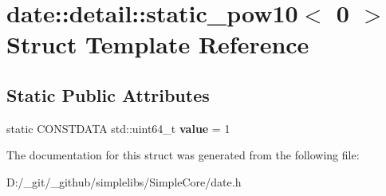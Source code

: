 \hypertarget{structdate_1_1detail_1_1static__pow10_3_010_01_4}{}\section{date\+::detail\+::static\+\_\+pow10$<$ 0 $>$ Struct Template Reference}
\label{structdate_1_1detail_1_1static__pow10_3_010_01_4}
\subsection*{Static Public Attributes}
\begin{DoxyCompactItemize}
\item 
\mbox{\label{structdate_1_1detail_1_1static__pow10_3_010_01_4_a5ff0b814137c34400cdc8e09cb3220d1}} 
static C\+O\+N\+S\+T\+D\+A\+TA std\+::uint64\+\_\+t {\bfseries value} = 1
\end{DoxyCompactItemize}


The documentation for this struct was generated from the following file\+:\begin{DoxyCompactItemize}
\item 
D\+:/\+\_\+git/\+\_\+github/simplelibs/\+Simple\+Core/date.\+h\end{DoxyCompactItemize}
